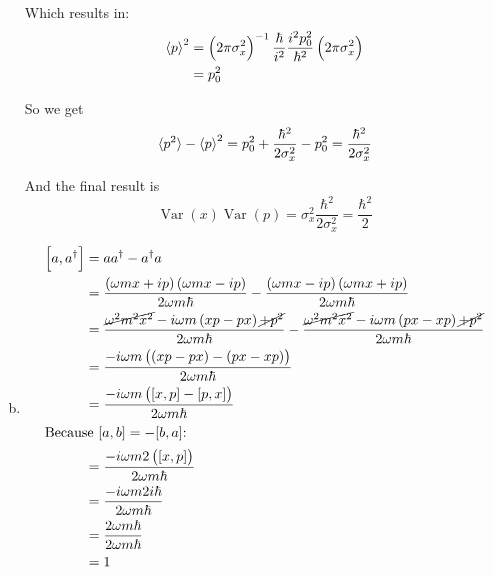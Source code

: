 \documentclass[a4paper,german,12pt,smallheadings]{scrartcl}
\DeclareMathOperator{\Var}{Var}
\begin{document}
\begin{enumerate}[a)]
    Which results in:
    \begin{align*}
      \braket{p}^2 &= \del{2 \pi \sigma_x^2}^{-1} \frac{\hbar}{i^2} \frac{i^2p_0^2}{\hbar^2} \del{2 \pi \sigma_x^2} \\
                   &= p_0^2
    \end{align*}

    So we get
    \begin{align*}
      \braket{p^2} - \braket{p}^2 = p_0^2 + \frac{\hbar^2}{2\sigma_x^2} - p_0^2 = \frac{\hbar^2}{2\sigma_x^2}
    \end{align*}

    And the final result is
    \begin{equation*}
      \Var(x)\Var(p) = \sigma_x^2 \frac{\hbar^2}{2 \sigma_x^2} = \frac{\hbar^2}{2}
    \end{equation*}

  \item
    \begin{align*}
      \sbr{a,a^\dagger} &= aa^\dagger - a^\dagger a \\
      &= \frac{\del{\omega m x + i p}\del{\omega m x - ip}}{2 \omega m \hbar} - \frac{\del{\omega m x - ip}\del{\omega m x + i p}}{2 \omega m \hbar} \\
      &= \frac{\cancel{\omega^2 m^2 x^2} - i \omega m \del{xp -px} \cancel{+ p^2}}{2 \omega m \hbar} -
          \frac{\cancel{\omega^2 m^2 x^2} - i \omega m \del{px-xp} \cancel{+ p^2}}{2 \omega m \hbar} \\
          &= \frac{-i \omega m \del{\del{xp-px} - \del{px-xp}}}{2 \omega m \hbar} \\
          &= \frac{-i \omega m \del{[x,p] - [p,x]}}{2 \omega m \hbar} \\
          \intertext{Because $[a,b] = -[b,a]$:}
          &= \frac{-i \omega m 2\del{[x,p]}}{2 \omega m \hbar} \\
          &= \frac{-i \omega m 2 i \hbar}{2 \omega m \hbar} \\
          &= \frac{2 \omega m \hbar}{2 \omega m \hbar} \\
          &= 1
    \end{align*}


\end{enumerate}
\end{document}

